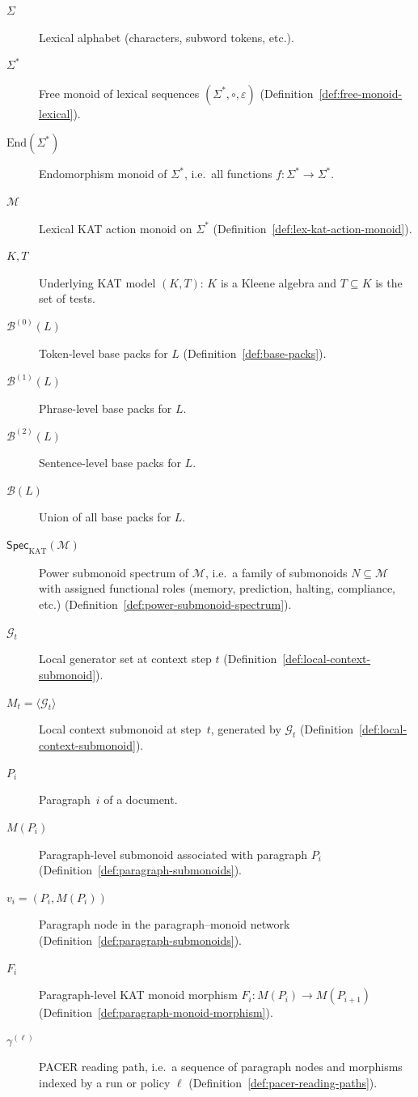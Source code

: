 \documentclass[11pt]{book}
\theoremstyle{plain}
\theoremstyle{definition}
\theoremstyle{remark}
\begin{document}
\begin{description}
  \item[$\Sigma$] Lexical alphabet (characters, subword tokens, etc.).
  \item[$\Sigma^*$] Free monoid of lexical sequences
        $(\Sigma^*,\circ,\varepsilon)$
        (Definition~\ref{def:free-monoid-lexical}).
  \item[$\mathrm{End}(\Sigma^*)$] Endomorphism monoid of $\Sigma^*$,
        i.e.\ all functions $f:\Sigma^*\to\Sigma^*$.
  \item[$\mathcal{M}$] Lexical KAT action monoid on $\Sigma^*$
        (Definition~\ref{def:lex-kat-action-monoid}).
  \item[$K,T$] Underlying KAT model $(K,T)$: $K$ is a Kleene algebra
        and $T\subseteq K$ is the set of tests.
  \item[$\mathcal{B}^{(0)}(L)$] Token-level base packs for $L$
        (Definition~\ref{def:base-packs}).
  \item[$\mathcal{B}^{(1)}(L)$] Phrase-level base packs for $L$.
  \item[$\mathcal{B}^{(2)}(L)$] Sentence-level base packs for $L$.
  \item[$\mathcal{B}(L)$] Union of all base packs for $L$.
  \item[$\mathsf{Spec}_{\mathrm{KAT}}(\mathcal{M})$] Power submonoid
        spectrum of $\mathcal{M}$, i.e.\ a family of submonoids
        $N\subseteq\mathcal{M}$ with assigned functional roles (memory,
        prediction, halting, compliance, etc.)
        (Definition~\ref{def:power-submonoid-spectrum}).
  \item[$\mathcal{G}_t$] Local generator set at context step $t$
        (Definition~\ref{def:local-context-submonoid}).
  \item[$M_t=\langle\mathcal{G}_t\rangle$] Local context submonoid at
        step~$t$, generated by $\mathcal{G}_t$
        (Definition~\ref{def:local-context-submonoid}).
  \item[$P_i$] Paragraph~$i$ of a document.
  \item[$M(P_i)$] Paragraph-level submonoid associated with paragraph
        $P_i$ (Definition~\ref{def:paragraph-submonoids}).
  \item[$v_i=(P_i,M(P_i))$] Paragraph node in the paragraph–monoid
        network (Definition~\ref{def:paragraph-submonoids}).
  \item[$F_i$] Paragraph-level KAT monoid morphism
        $F_i:M(P_i)\to M(P_{i+1})$
        (Definition~\ref{def:paragraph-monoid-morphism}).
  \item[$\gamma^{(\ell)}$] PACER reading path, i.e.\ a sequence of
        paragraph nodes and morphisms indexed by a run or policy
        $\ell$ (Definition~\ref{def:pacer-reading-paths}).
\end{description}
\end{document}
